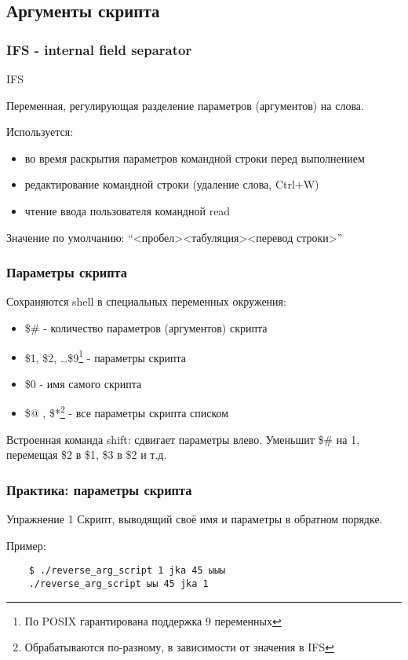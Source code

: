 \subsection{Аргументы скрипта}
\begin{frame}[fragile]
  \frametitle{IFS - internal field separator}

  \alert{IFS}

  Переменная, регулирующая разделение параметров (аргументов) на слова. 
  
  Используется:
  \begin{itemize}
    \item во время раскрытия параметров командной строки перед выполнением
    \item редактирование командной строки (удаление слова, Ctrl+W)
    \item чтение ввода пользователя командной \alert{read}
  \end{itemize}

  Значение по умолчанию: ``<пробел><табуляция><перевод строки>''


\end{frame}

\begin{frame}[fragile]
  \frametitle{Параметры скрипта}

  Сохраняются shell в специальных переменных окружения:
  \begin{itemize}
    \item \alert{\$\#} - количество параметров (аргументов) скрипта
    \item \alert{\$1, \$2, \ldots \$9}\footnote{По POSIX гарантирована поддержка 9 переменных} - параметры скрипта
      
\pause
    \item \alert{\$0} - имя самого скрипта
    \item \alert{\$@ , \$*}\footnote{Обрабатываются по-разному, в зависимости от значения в IFS} - все параметры скрипта списком 
  \end{itemize} \pause
  Встроенная команда \alert{shift}: сдвигает параметры влево. 
  Уменьшит \alert{\$\#} на 1, перемещая \alert{\$2} в \alert{\$1}, \alert{\$3} в \alert{\$2} и т.д.


\end{frame}

\begin{frame}[fragile]
  \frametitle{Практика: параметры скрипта}

  \alert{Упражнение 1} Скрипт, выводящий своё имя и параметры в обратном порядке.

  Пример:
  \begin{verbatim}
    $ ./reverse_arg_script 1 jka 45 ыыы
    ./reverse_arg_script ыы 45 jka 1
  \end{verbatim}

\end{frame}

